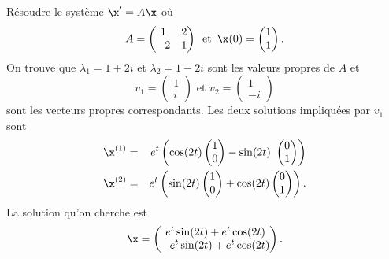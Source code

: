 {\begin{example}
  \label{exe:21}
  Résoudre le système $\x' = A\x$ où 
  \begin{displaymath}
    A  =
    \begin{pmatrix}
      1 & 2 \\
      -2 & 1
    \end{pmatrix} \, \text{ et } \, \x(0) =
    \begin{pmatrix}
      1\\1
    \end{pmatrix}. 
  \end{displaymath}
 On trouve que $\lambda_1 = 1 + 2 i$ et $\lambda_2 = 1 - 2i$ sont les valeurs propres de $A$ et 
 \begin{displaymath}
   v_1 =
   \begin{pmatrix}
     1\\i
   \end{pmatrix} \text{ et } v_2 =
   \begin{pmatrix}
     1 \\ -i
   \end{pmatrix}
 \end{displaymath}
sont les vecteurs propres correspondants. 
Les deux solutions impliquées par $v_1$ sont 
\begin{eqnarray*}
  \x^{(1)} & = & e^{ t} \left(\cos ( 2t)
                 \begin{pmatrix}
                   1\\0
                 \end{pmatrix}
- \sin (2t)\
  \begin{pmatrix}
    0\\1
  \end{pmatrix}
\right) \\
  \x^{(2)} & = &  e^{t} \left(\sin ( 2t )
                 \begin{pmatrix}
                   1\\0
                 \end{pmatrix}
+ \cos(2t)
  \begin{pmatrix}
    0\\1
  \end{pmatrix}
\right). 
\end{eqnarray*} 
La solution qu'on cherche est 
\begin{displaymath}
  \x = \begin{pmatrix}
           e^{t} \sin (2t) + e^{t} \cos(2t) \\
           - e^{t} \sin(2t) + e^{t} \cos(2t)
         \end{pmatrix}.
\end{displaymath}


\end{example}}
